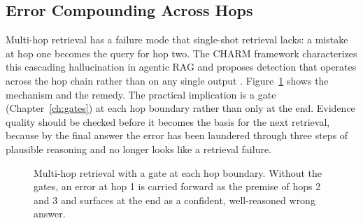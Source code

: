 \documentclass[11pt]{book}
\begin{document}
\subsection{Error Compounding Across Hops}

Multi-hop retrieval has a failure mode that single-shot retrieval lacks: a mistake at hop one becomes the query for hop two. The CHARM framework characterizes this cascading hallucination in agentic RAG and proposes detection that operates across the hop chain rather than on any single output \cite{charm2026}. Figure~\ref{fig:multihop} shows the mechanism and the remedy. The practical implication is a gate (Chapter~\ref{ch:gates}) at each hop boundary rather than only at the end. Evidence quality should be checked before it becomes the basis for the next retrieval, because by the final answer the error has been laundered through three steps of plausible reasoning and no longer looks like a retrieval failure.

\begin{figure}[htbp]
\centering
{}
\caption{Multi-hop retrieval with a gate at each hop boundary. Without the gates, an error at hop 1 is carried forward as the premise of hops 2 and 3 and surfaces at the end as a confident, well-reasoned wrong answer.}
\label{fig:multihop}
\end{figure}
\end{document}
